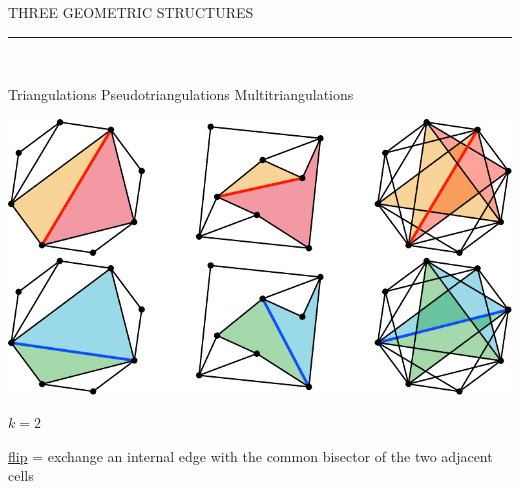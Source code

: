 \documentclass[12pt,titlepage,landscape,a4paper]{article}
\newcommand{\textemoyen}{\fontsize{23}{27}\selectfont}
\newenvironment{slide}[1]
{
\newpage
\begin{center}
{\blue \textemoyen \uppercase{#1}}\\
\end{center}
\vspace{-1cm}
\rule{\textwidth}{0.5 pt}\\
\vspace{-.8cm}
}
{\vspace*{-3cm}}
\newcommand{\blue}{\color{blue}} %
\renewcommand{\emph}[1]{\uline{#1}}
\begin{document}
\begin{slide}{Three geometric structures}

\hspace{1.6cm} Triangulations \hspace{3.4cm} Pseudotriangulations \hspace{2.5cm} Multitriangulations\\
\begin{center}\includegraphics[scale=1.9]{geometricStructures3}\end{center}
\vspace{-8cm} \hspace*{25.7cm} ${k=2}$

\vspace{7cm}
\begin{center}
\emph{flip} = exchange an internal edge with the common bisector of the two adjacent cells
\end{center}

\vspace{-1cm}
\end{slide}
\end{document}
